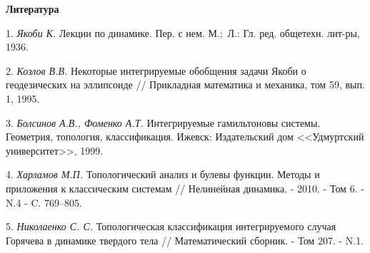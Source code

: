 \smallskip \centerline{\bf Литература}\nopagebreak

1.  {\it Якоби К.} Лекции по динамике. Пер. с нем. М.;~Л.: Гл. ред. общетехн. лит-ры, 1936.

2.  {\it Козлов В.В.} Некоторые интегрируемые обобщения задачи Якоби о геодезических на эллипсоиде // Прикладная математика и механика, том 59, вып. 1, 1995.

3.  {\it Болсинов А.В., Фоменко А.Т.} Интегрируемые гамильтоновы системы. Геометрия, топология, классификация. Ижевск: Издательский дом <<Удмуртский университет>>, 1999.

4. {\it Харламов М.П.} Топологический анализ и булевы функции. Методы и приложения к классическим системам // Нелинейная динамика. - 2010. - Том 6. - N.4 - C. 769--805.

5. {\it Николаенко С. С.} Топологическая классификация интегрируемого случая Горячева в динамике твердого тела // Математический сборник. - Том 207. - N.1.

